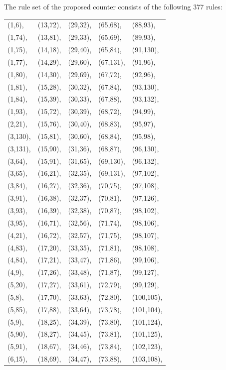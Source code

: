 \documentclass[twocolumn]{svjour3}
\begin{document}
The rule set of the proposed counter consists of the following 377 rules: 
\begin{center}
\begin{supertabular}[tb]{l l l l l}
\label{table:rule}
(1,6),&(13,72),&(29,32), &(65,68),&(88,93),\\
(1,74),&(13,81),&(29,33),&(65,69),&(89,93),\\
(1,75),&(14,18),&(29,40),&(65,84),&(91,130),\\
(1,77),&(14,29),&(29,60),&(67,131),&(91,96),\\
(1,80),&(14,30),&(29,69),&(67,72),&(92,96),\\
(1,81),&(15,28),&(30,32),&(67,84),&(93,130),\\
(1,84),&(15,39),&(30,33),&(67,88),&(93,132),\\
(1,93),&(15,72),&(30,39),&(68,72),&(94,99),\\
(2,21),&(15,76),&(30,40),&(68,83),&(95,97),\\
(3,130),&(15,81),&(30,60),&(68,84),&(95,98),\\
(3,131),&(15,90),&(31,36),&(68,87),&(96,130),\\
(3,64),&(15,91),&(31,65),&(69,130),&(96,132),\\
(3,65),&(16,21),&(32,35),&(69,131),&(97,102),\\
(3,84),&(16,27),&(32,36),&(70,75),&(97,108),\\
(3,91),&(16,38),&(32,37),&(70,81),&(97,126),\\
(3,93),&(16,39),&(32,38),&(70,87),&(98,102),\\
(3,95),&(16,71),&(32,56),&(71,74),&(98,106),\\
(4,21),&(16,72),&(32,57),&(71,75),&(98,107),\\
(4,83),&(17,20),&(33,35),&(71,81),&(98,108),\\
(4,84),&(17,21),&(33,47),&(71,86),&(99,106),\\
(4,9),&(17,26),&(33,48),&(71,87),&(99,127),\\
(5,20),&(17,27),&(33,61),&(72,79),&(99,129),\\
(5,8),&(17,70),&(33,63),&(72,80),&(100,105),\\
(5,85),&(17,88),&(33,64),&(73,78),&(101,104),\\
(5,9),&(18,25),&(34,39),&(73,80),&(101,124),\\
(5,90),&(18,27),&(34,45),&(73,81),&(101,125),\\
(5,91),&(18,67),&(34,46),&(73,84),&(102,123),\\
(6,15),&(18,69),&(34,47),&(73,88),&(103,108),\\

\end{supertabular}
\end{center}
\end{document}

